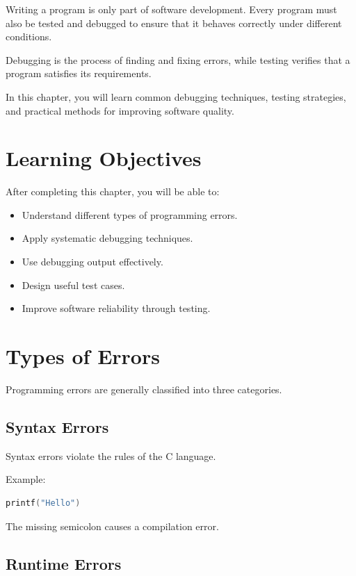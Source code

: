 \documentclass[12pt,openany]{book}
\begin{document}
Writing a program is only part of software development. Every program must also be tested and debugged to ensure that it behaves correctly under different conditions.

Debugging is the process of finding and fixing errors, while testing verifies that a program satisfies its requirements.

In this chapter, you will learn common debugging techniques, testing strategies, and practical methods for improving software quality.

\section{Learning Objectives}

After completing this chapter, you will be able to:

\begin{itemize}
    \item Understand different types of programming errors.
    \item Apply systematic debugging techniques.
    \item Use debugging output effectively.
    \item Design useful test cases.
    \item Improve software reliability through testing.
\end{itemize}

\section{Types of Errors}

Programming errors are generally classified into three categories.

\subsection*{Syntax Errors}

Syntax errors violate the rules of the C language.

Example:

\begin{lstlisting}[language=C]
printf("Hello")
\end{lstlisting}

The missing semicolon causes a compilation error.

\subsection*{Runtime Errors}
\end{document}
